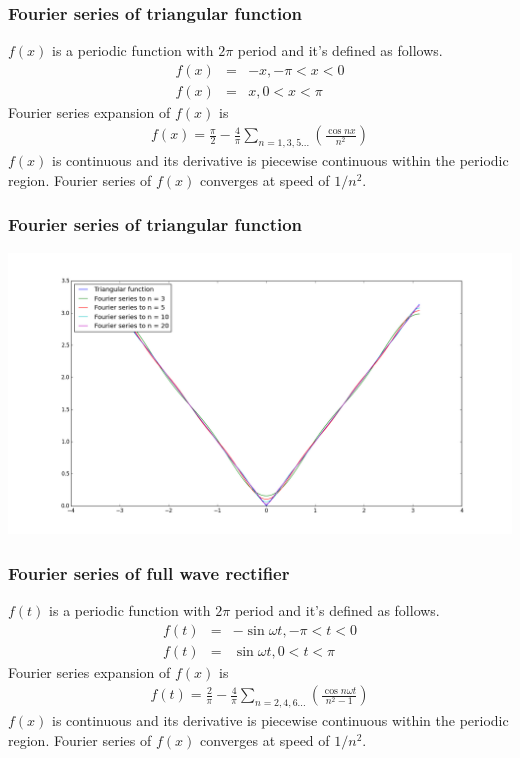\documentclass{beamer}
\begin{document}
\begin{frame}
\frametitle{Fourier series of triangular function}
$f(x)$ is a periodic function with $2\pi$ period and it's defined as follows.
\begin{eqnarray}
f(x)&=& -x, -\pi < x < 0 \nonumber \\
f(x)&=& x, 0 < x < \pi
\label{eq:traiangularfunc}
\end{eqnarray}
Fourier series expansion of $f(x)$ is
\begin{eqnarray}
f(x)= \frac{\pi}{2} - \frac{4}{\pi} \sum_{n=1,3,5...} \left( \frac{\cos nx}{n^2} \right)
\label{eq:traiangularfunc_ft}
\end{eqnarray}
$f(x)$ is continuous and its derivative is piecewise continuous within the periodic region. Fourier series of $f(x)$ converges at speed of $1/n^2$.
\end{frame}
\begin{frame}
\frametitle{Fourier series of triangular function}
\includegraphics[scale=0.3]{triangular.png}
\end{frame}
\begin{frame}
\frametitle{Fourier series of full wave rectifier}
$f(t)$ is a periodic function with $2\pi$ period and it's defined as follows.
\begin{eqnarray}
f(t)&=& -\sin {\omega t}, -\pi < t < 0 \nonumber \\
f(t)&=& \sin {\omega t}, 0 < t < \pi
\label{eq:fullrectifier_func}
\end{eqnarray}
Fourier series expansion of $f(x)$ is
\begin{eqnarray}
f(t)= \frac{2}{\pi} - \frac{4}{\pi} \sum_{n=2,4,6...} \left( \frac{\cos n\omega t}{n^2 - 1} \right)
\label{eq:fullrectifier_func_ft}
\end{eqnarray}
$f(x)$ is continuous and its derivative is piecewise continuous within the periodic region. Fourier series of $f(x)$ converges at speed of $1/n^2$.
\end{frame}
\end{document}
